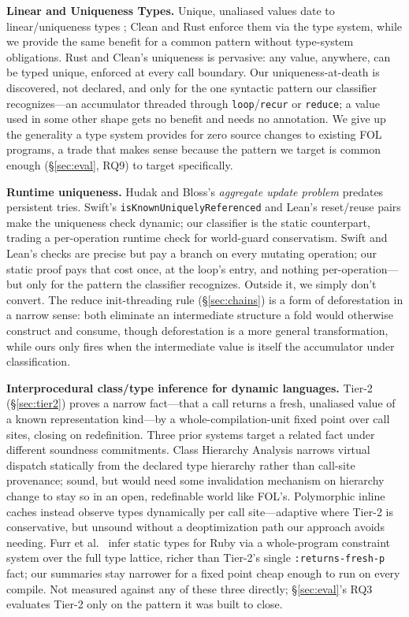 \documentclass[sigplan,review,anonymous]{acmart}
\begin{document}
\textbf{Linear and Uniqueness Types.} Unique, unaliased values date to linear/uniqueness types \cite{wadler1990linear}; Clean and Rust enforce them via the type system, while we provide the same benefit for a common pattern without type-system obligations. Rust and Clean's uniqueness is pervasive: any value, anywhere, can be typed unique, enforced at every call boundary. Our uniqueness-at-death is discovered, not declared, and only for the one syntactic pattern our classifier recognizes---an accumulator threaded through \texttt{loop}/\texttt{recur} or \texttt{reduce}; a value used in some other shape gets no benefit and needs no annotation. We give up the generality a type system provides for zero source changes to existing FOL programs, a trade that makes sense because the pattern we target is common enough (§\ref{sec:eval}, RQ9) to target specifically.

\textbf{Runtime uniqueness.} Hudak and Bloss's \emph{aggregate update problem} \cite{hudak1985aggregate} predates persistent tries. Swift's \texttt{isKnownUniquelyReferenced} \cite{swift2023cow} and Lean's reset/reuse pairs \cite{ullrich2019beans} make the uniqueness check dynamic; our classifier is the static counterpart, trading a per-operation runtime check for world-guard conservatism. Swift and Lean's checks are precise but pay a branch on every mutating operation; our static proof pays that cost once, at the loop's entry, and nothing per-operation---but only for the pattern the classifier recognizes. Outside it, we simply don't convert. The reduce init-threading rule (§\ref{sec:chains}) is a form of deforestation \cite{wadler1990deforestation} in a narrow sense: both eliminate an intermediate structure a fold would otherwise construct and consume, though deforestation is a more general transformation, while ours only fires when the intermediate value is itself the accumulator under classification.

\textbf{Interprocedural class/type inference for dynamic languages.} Tier-2 (§\ref{sec:tier2}) proves a narrow fact---that a call returns a fresh, unaliased value of a known representation kind---by a whole-compilation-unit fixed point over call sites, closing on redefinition. Three prior systems target a related fact under different soundness commitments. Class Hierarchy Analysis \cite{dean1995cha} narrows virtual dispatch statically from the declared type hierarchy rather than call-site provenance; sound, but would need some invalidation mechanism on hierarchy change to stay so in an open, redefinable world like FOL's. Polymorphic inline caches \cite{holzle1991pic} instead observe types dynamically per call site---adaptive where Tier-2 is conservative, but unsound without a deoptimization path our approach avoids needing. Furr et al.\ \cite{furr2009ruby} infer static types for Ruby via a whole-program constraint system over the full type lattice, richer than Tier-2's single \texttt{:returns-fresh-p} fact; our summaries stay narrower for a fixed point cheap enough to run on every compile. Not measured against any of these three directly; §\ref{sec:eval}'s RQ3 evaluates Tier-2 only on the pattern it was built to close.
\end{document}
